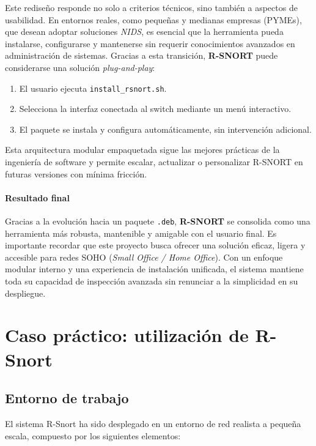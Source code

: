 \documentclass[11pt,a4paper,twoside]{report}
\begin{document}
Este rediseño responde no solo a criterios técnicos, sino también a aspectos de usabilidad. En entornos reales, como pequeñas y medianas empresas (PYMEs), que desean adoptar soluciones \textit{NIDS}, es esencial que la herramienta pueda instalarse, configurarse y mantenerse sin requerir conocimientos avanzados en administración de sistemas. Gracias a esta transición, \textbf{R-SNORT} puede considerarse una solución \textit{plug-and-play}:

\begin{enumerate}
	\item El usuario ejecuta \texttt{install\_rsnort.sh}.
	\item Selecciona la interfaz conectada al switch mediante un menú interactivo.
	\item El paquete se instala y configura automáticamente, sin intervención adicional.
\end{enumerate}

Esta arquitectura modular empaquetada sigue las mejores prácticas de la ingeniería de software y permite escalar, actualizar o personalizar R-SNORT en futuras versiones con mínima fricción.

\pagebreak

\subsubsection{Resultado final}

Gracias a la evolución hacia un paquete \texttt{.deb}, \textbf{R-SNORT} se consolida como una herramienta más robusta, mantenible y amigable con el usuario final. Es importante recordar que este proyecto busca ofrecer una solución eficaz, ligera y accesible para redes SOHO (\textit{Small Office / Home Office}). Con un enfoque modular interno y una experiencia de instalación unificada, el sistema mantiene toda su capacidad de inspección avanzada sin renunciar a la simplicidad en su despliegue.



\chapter{Caso práctico: utilización de R-Snort}

\section{Entorno de trabajo}

El sistema R-Snort ha sido desplegado en un entorno de red realista a pequeña escala, compuesto por los siguientes elementos:
\end{document}
